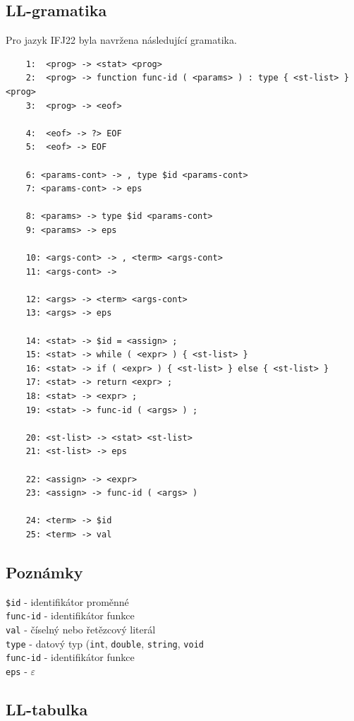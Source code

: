 \documentclass[11pt,a4paper]{article}
\renewcommand{\familydefault}{\sfdefault}
\begin{document}
\pagebreak{}
\subsection{LL-gramatika}
Pro jazyk IFJ22 byla navržena následující gramatika.
\begin{Verbatim}
	1:  <prog> -> <stat> <prog>
	2:  <prog> -> function func-id ( <params> ) : type { <st-list> } <prog>
	3:  <prog> -> <eof>
		
	4:  <eof> -> ?> EOF
	5:  <eof> -> EOF
		
	6: <params-cont> -> , type $id <params-cont>
	7: <params-cont> -> eps
		
	8: <params> -> type $id <params-cont>
	9: <params> -> eps
		
	10: <args-cont> -> , <term> <args-cont>
	11: <args-cont> -> 
		
	12: <args> -> <term> <args-cont>
	13: <args> -> eps
		
	14: <stat> -> $id = <assign> ;
	15: <stat> -> while ( <expr> ) { <st-list> }
	16: <stat> -> if ( <expr> ) { <st-list> } else { <st-list> }
	17: <stat> -> return <expr> ;
	18: <stat> -> <expr> ;
	19: <stat> -> func-id ( <args> ) ;
		
	20: <st-list> -> <stat> <st-list>
	21: <st-list> -> eps
		
	22: <assign> -> <expr>
	23: <assign> -> func-id ( <args> )
		
	24: <term> -> $id
	25: <term> -> val
\end{Verbatim}
\subsection*{Poznámky}
\texttt{\$id} - identifikátor proměnné\\
\texttt{func-id} - identifikátor funkce\\
\texttt{val} - číselný nebo řetězcový literál \\
\texttt{type} - datový typ (\texttt{int}, \texttt{double}, \texttt{string}, \texttt{void} \\
\texttt{func-id} - identifikátor funkce \\
\texttt{eps} - $\varepsilon$ \\

\subsection{LL-tabulka}

\renewcommand{\familydefault}{\ttdefault}
\end{document}
